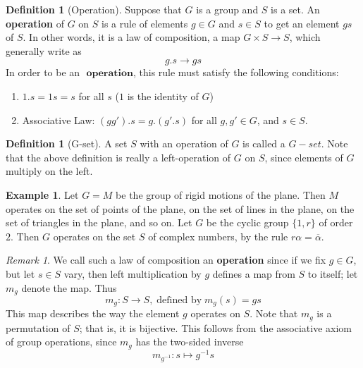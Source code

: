 \documentclass[12pt]{article}
\theoremstyle{definition}
\newtheorem{defn}[thm]{Definition}
\newtheorem{eg}[thm]{Example}
\theoremstyle{remark}
\newtheorem{rmk}[thm]{Remark}
\numberwithin{equation}{section}
\newcommand\B[1]{\textbf{ #1}}
\begin{document}
\begin{defn}[Operation]
        Suppose that $G$ is a group and $S$ is a set. An \B{operation} of $G$ on $S$ is a rule of elements $g \in G$ and $s \in S$ to get an element $gs$ of $S$. In other words, it is a law of composition, a map $G\times S \rightarrow S$, which generally write as \begin{equation}
                g.s\rightarrow gs
        \end{equation}
        In order to be an $\B{operation}$, this rule must satisfy the following conditions:\begin{enumerate}
                \item $1.s = 1s = s$ for all $s$ ($1$ is the identity of $G$)
                \item Associative Law: $(gg').s = g.(g'.s)$ for all $g,g' \in G$, and $s \in S$.
        \end{enumerate}
\end{defn}


\vspace{15pt}

\begin{defn}[G-set]
        A set $S$ with an operation of $G$ is called a $G-set$. Note that the above definition is really a left-operation of $G$ on $S$, since elements of $G$ multiply on the left.
\end{defn}

\vspace{15pt}


\begin{eg}
        Let $G=M$ be the group of rigid motions of the plane. Then $M$ operates on the set of points of the plane, on the set of lines in the plane, on the set of triangles in the plane, and so on. Let $G$ be the cyclic group $\{1,r\}$ of order $2$. Then $G$ operates on the set $S$ of complex numbers, by the rule $r\alpha=\overline{\alpha}$.
\end{eg}

\vspace{15pt}

\begin{rmk}
        We call such a law of composition an \B{operation} since if we fix $g \in G$, but let $s \in S$ vary, then left multiplication by $g$ defines a map from $S$ to itself; let $m_g$ denote the map. Thus \begin{equation}
                m_g:S \rightarrow S,\;\text{defined by}\;m_g(s)=gs
        \end{equation}
        This map describes the way the element $g$ operates on $S$. Note that $m_g$ is a permutation of $S$; that is, it is bijective. This follows from the associative axiom of group operations, since $m_g$ has the two-sided inverse \begin{equation}
                m_{g^{-1}}: s\mapsto g^{-1}s
        \end{equation}
\end{rmk}
\end{document}
